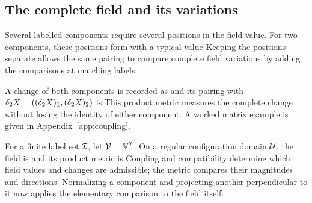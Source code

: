 \subsection{The complete field and its variations}
Several labelled components require several positions in the field value. For two components, these positions form
\FieldTwoComponentSpaceDisplay
with a typical value
\FieldTwoComponentValueDisplay
Keeping the positions separate allows the same pairing to compare complete field variations by adding the comparisons at matching labels.

A change of both components is recorded as
\FieldTwoComponentChangeDisplay
and its pairing with $\delta_2X=((\delta_2X)_1,(\delta_2X)_2)$ is
\FieldTwoComponentMetricDisplay
This product metric measures the complete change without losing the identity of either component. A worked matrix example is given in Appendix~\ref{app:coupling}.

For a finite label set $\mathcal I$, let $\mathcal V=\mathbb V^{\mathcal I}$. On a regular configuration domain $\mathcal U$, the field is
\FieldDefinitionDisplay
and its product metric is
\FieldProductMetricDisplay
Coupling and compatibility determine which field values and changes are admissible; the metric compares their magnitudes and directions. Normalizing a component and projecting another perpendicular to it now applies the elementary comparison to the field itself.

